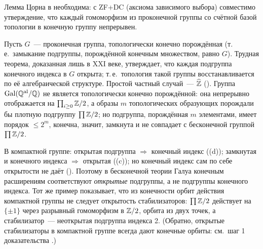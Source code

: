 \begin{aside}[7.31]
Лемма Цорна в  необходима: с ZF+DC (аксиома зависимого выбора) совместимо утверждение, что каждый гомоморфизм из
проконечной группы со счётной базой топологии в конечную группу непрерывен.
\end{aside}

\begin{aside}[7.32]
Пусть $G$~--- проконечная группа, топологически конечно порождённая (т.\,е.\ замыкание подгруппы, порождённой конечным
множеством, равно $G$). Трудная теорема, доказанная лишь в XXI веке, утверждает, что каждая
подгруппа конечного индекса в $G$ открыта; т.\,е.\ топология такой группы восстанавливается по её алгебраической
структуре. Простой частный случай~--- $\widehat{\mathbb Z}$ (). Группа $\operatorname{Gal}(\mathbb Q^{\mathrm{al}}/\mathbb Q)$ не является топологически конечно порождённой:
она непрерывно отображается на $\prod_{i\ge0}\mathbb Z/2$, а образы $m$ топологических образующих порождали бы плотную подгруппу
$\prod\mathbb Z/2$; но подгруппа, порождённая $m$ элементами, имеет порядок $\le2^m$, конечна, значит, замкнута и не совпадает
с бесконечной группой $\prod\mathbb Z/2$.
\end{aside}

\begin{remark}
В компактной группе: открытая подгруппа $\Rightarrow$ конечный индекс ((d)); замкнутая и конечного индекса
$\Rightarrow$ открытая ((c)); но конечный индекс сам по себе открытости не даёт (). Поэтому в бесконечной теории
Галуа конечным расширениям соответствуют \emph{открытые} подгруппы, а не подгруппы конечного индекса. Тот же пример
показывает, что из конечности орбит действия компактной группы не следует открытость стабилизаторов: $\prod\mathbb Z/2$
действует на $\{\pm1\}$ через разрывный гомоморфизм в $\mathbb Z/2$, орбита из двух точек, а стабилизатор~--- неоткрытая
подгруппа индекса 2. (Обратно, открытые стабилизаторы в компактной группе всегда дают конечные орбиты: см.\ шаг 1
доказательства .)
\end{remark}
